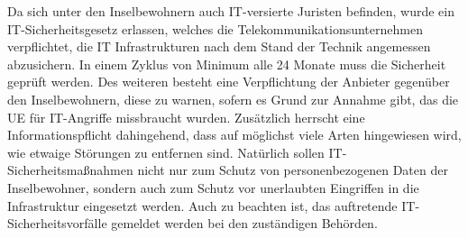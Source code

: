 Da sich unter den Inselbewohnern auch IT-versierte Juristen befinden, wurde ein IT-Sicherheitsgesetz erlassen, welches die Telekommunikationsunternehmen verpflichtet, die IT Infrastrukturen nach dem Stand der Technik angemessen abzusichern. In einem Zyklus von Minimum alle 24 Monate muss die Sicherheit geprüft werden.
Des weiteren besteht eine Verpflichtung der Anbieter gegenüber den Inselbewohnern, diese zu warnen, sofern es Grund zur Annahme gibt, das die UE für IT-Angriffe missbraucht wurden. Zusätzlich herrscht eine Informationspflicht dahingehend, dass auf möglichst viele Arten hingewiesen wird, wie etwaige Störungen zu entfernen sind.
Natürlich sollen IT-Sicherheitsmaßnahmen nicht nur zum Schutz von personenbezogenen Daten der Inselbewohner, sondern auch zum Schutz vor unerlaubten Eingriffen in die Infrastruktur eingesetzt werden.
Auch zu beachten ist, das auftretende IT-Sicherheitsvorfälle gemeldet werden bei den zuständigen Behörden.\cite{BSI17}  